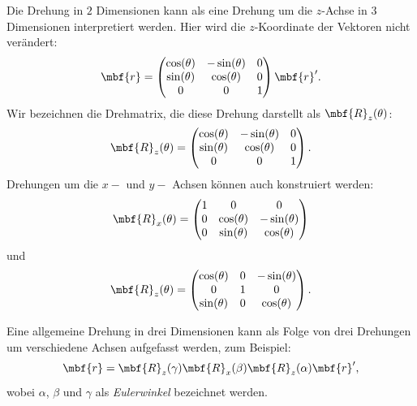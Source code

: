 Die Drehung in $2$ Dimensionen kann als eine Drehung um die $z$-Achse in $3$ Dimensionen interpretiert werden. Hier wird die $z$-Koordinate der Vektoren nicht verändert:
\begin{equation}
  \mbf{r} = \begin{pmatrix}
    \cos(\theta) & -\sin(\theta) & 0 \\ 
    \sin(\theta) & \cos(\theta) & 0 \\ 
    0 & 0 & 1
  \end{pmatrix}\mbf{r}'.
\end{equation}
\figbox
Wir bezeichnen die Drehmatrix, die diese Drehung darstellt als $\mbf{R}_z(\theta)$:
\begin{equation}
  \mbf{R}_z(\theta) = \begin{pmatrix}
    \cos(\theta) & -\sin(\theta) & 0 \\ 
    \sin(\theta) & \cos(\theta) & 0 \\ 
    0 & 0 & 1
  \end{pmatrix}.
\end{equation}
Drehungen um die $x-$ und $y-$ Achsen können auch konstruiert werden:
\begin{equation}
  \mbf{R}_x(\theta) = \begin{pmatrix}
    1&  0 & 0 \\
    0& \cos(\theta) & -\sin(\theta) \\ 
    0& \sin(\theta) & \cos(\theta)
  \end{pmatrix}
\end{equation}
und
\begin{equation}
  \mbf{R}_z(\theta) = \begin{pmatrix}
    \cos(\theta) & 0 &-\sin(\theta) \\ 
    0 & 1 & 0 \\
    \sin(\theta) & 0 & \cos(\theta) 
  \end{pmatrix}.
\end{equation}

Eine allgemeine Drehung in drei Dimensionen kann als Folge von drei Drehungen um verschiedene Achsen aufgefasst werden, zum Beispiel:
\begin{equation}
  \mbf{r} = \mbf{R}_z(\gamma)\mbf{R}_x(\beta)\mbf{R}_z(\alpha) \mbf{r}',
\end{equation}
wobei $\alpha$, $\beta$ und $\gamma$  als \emph{Eulerwinkel} bezeichnet werden.

